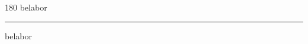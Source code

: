 
\begin{frame}
\begin{center}
\begin{turn}{180}
{\fontsize{2.5cm}{1em}\selectfont belabor}
\end{turn}
\vspace{1em}\par  
\hrule
\vspace{1em}\par  
{\fontsize{2.5cm}{1em}\selectfont belabor}
\end{center}
\end{frame}
